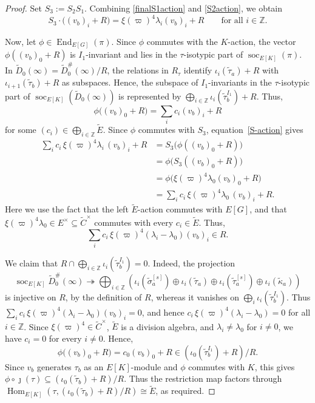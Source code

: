 \documentclass[a4paper,10pt,twoside]{amsart}
\DeclareMathOperator{\End}{End}
\DeclareMathOperator{\soc}{soc}
\DeclareMathOperator{\Hom}{Hom}
\theoremstyle{definition}
\numberwithin{equation}{section}
\begin{document}
\begin{proof}
Set \(S_3:=S_2S_1\). Combining \eqref{finalS1action} and \eqref{S2action}, we obtain
\begin{equation}\label{S-action}
S_3\cdot\bigl((v_b)_i+R\bigr)
=
\xi(\varpi)^4\lambda_i(v_b)_i+R
\qquad\text{for all }i\in\mathbb Z.
\end{equation}

Now, let \(\phi\in\End_{E[G]}(\pi)\). Since \(\phi\) commutes with the
\(K\)-action, the vector \(\phi((v_b)_0+R)\) is \(I_1\)-invariant
and lies in the \(\tau\)-isotypic part of \(\soc_{E[K]}(\pi)\). In
\(\widetilde D_0(\infty)=\widetilde D_0^\#(\infty)/R\), the
relations in \(R_\tau\) identify
\(\iota_i(\widetilde\tau_a)+R\) with
\(\iota_{i+1}(\widetilde\tau_b)+R\) as subspaces. Hence, the subspace of $I_1$-invariants in the \(\tau\)-isotypic part of \(\soc_{E[K]}(\widetilde D_0(\infty))\) is represented by
\(
\bigoplus_{i\in\mathbb Z}\iota_i(\widetilde\tau_b^{I_1})+R.
\)
Thus,
\[
\phi\bigl((v_b)_0+R\bigr)
=
\sum_i c_i (v_b)_i+R
\]
for some \((c_i) \in
\bigoplus_{i \in \mathbb Z} \widetilde E\). Since \(\phi\) commutes with \(S_3\), equation~\eqref{S-action} gives
\begin{align*}
\sum_i c_i\,\xi(\varpi)^4\lambda_i\,(v_b)_i+R
&=
S_3\bigl(\phi((v_b)_0+R)\bigr) \\
&=
\phi\bigl(S_3((v_b)_0+R)\bigr) \\
&=
\phi\bigl(\xi(\varpi)^4\lambda_0 (v_b)_0+R\bigr) \\
&=
\sum_i c_i\,\xi(\varpi)^4\lambda_0\,(v_b)_i+R.
\end{align*}
Here we use the fact that the left \(\widetilde E\)-action commutes with \(E[G]\), and
that \(\xi(\varpi)^4\lambda_0\in E^\times\subseteq\widetilde C^\times\)
commutes with every \(c_i\in\widetilde E\). Thus,
\[
\sum_i c_i\,\xi(\varpi)^4(\lambda_i-\lambda_0)(v_b)_i\in R.
\]

We claim that
\(
R\cap
\bigoplus_{i\in\mathbb Z}\iota_i(\widetilde\tau_b^{I_1})
=0.
\) Indeed, the projection
\[
\operatorname{soc}_{E[K]}\widetilde D_0^\#(\infty)
\twoheadrightarrow
\bigoplus_{i\in\mathbb Z}
\left(
\iota_i(\widetilde\sigma_a^{[s]})
\oplus
\iota_i(\widetilde\tau_a)
\oplus
\iota_i(\widetilde\tau_a^{[s]})
\oplus
\iota_i(\widetilde\kappa_a)
\right)
\]
is injective on \(R\), by the definition of
\(R\), whereas it vanishes on
\(
\bigoplus_i\iota_i(\widetilde\tau_b^{I_1})
\). Thus $\sum_i c_i\,\xi(\varpi)^4(\lambda_i-\lambda_0)(v_b)_i=0$, and hence $c_i\,\xi(\varpi)^4(\lambda_i-\lambda_0)=0$ for all $i \in \mathbb Z$. Since \(\xi(\varpi)^4\in\widetilde C^\times\), \(\widetilde E\) is a division
algebra, and \(\lambda_i\neq\lambda_0\) for \(i\neq0\), we have \(c_i=0\) for
every \(i\neq0\). Hence,
\[
\phi\bigl((v_b)_0+R\bigr)
=
c_0(v_b)_0+R
\in
(\iota_0(\widetilde\tau_b^{I_1})+R)/R.
\]
Since \(v_b\) generates \(\tau_b\) as an \(E[K]\)-module and \(\phi\) commutes
with \(K\), this gives
\(
\phi\circ\jmath(\tau)
\subseteq
(\iota_0(\widetilde\tau_b)+R)/R.
\) Thus the restriction map factors through
\(\Hom_{E[K]}(\tau,(\iota_0(\widetilde\tau_b)+R)/R)\cong
\widetilde{E}\), as required.
\end{proof}
\end{document}
